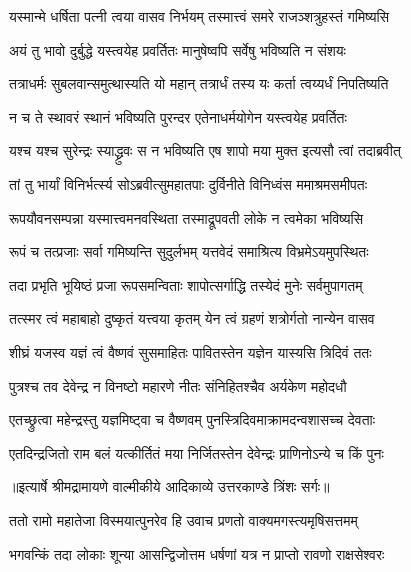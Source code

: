 \twolineshloka
{यस्मान्मे धर्षिता पत्नी त्वया वासव निर्भयम्}
{तस्मात्त्वं समरे राजञ्शत्रुहस्तं गमिष्यसि} %

\twolineshloka
{अयं तु भावो दुर्बुद्धे यस्त्वयेह प्रवर्तितः}
{मानुषेष्वपि सर्वेषु भविष्यति न संशयः} %

\twolineshloka
{तत्राधर्मः सुबलवान्समुत्थास्यति यो महान्}
{तत्रार्धं तस्य यः कर्ता त्वय्यर्धं निपतिष्यति} %

\twolineshloka
{न च ते स्थावरं स्थानं भविष्यति पुरन्दर}
{एतेनाधर्मयोगेन यस्त्वयेह प्रवर्तितः} %

\twolineshloka
{यश्च यश्च सुरेन्द्रः स्याद्ध्रुवः स न भविष्यति}
{एष शापो मया मुक्त इत्यसौ त्वां तदाब्रवीत्} %

\twolineshloka
{तां तु भार्यां विनिर्भर्त्स्य सोऽब्रवीत्सुमहातपाः}
{दुर्विनीते विनिध्वंस ममाश्रमसमीपतः} %

\twolineshloka
{रूपयौवनसम्पन्ना यस्मात्त्वमनवस्थिता}
{तस्माद्रूपवती लोके न त्वमेका भविष्यसि} %

\twolineshloka
{रूपं च तत्प्रजाः सर्वा गमिष्यन्ति सुदुर्लभम्}
{यत्तवेदं समाश्रित्य विभ्रमेऽयमुपस्थितः} %

\twolineshloka
{तदा प्रभृति भूयिष्ठं प्रजा रूपसमन्विताः}
{शापोत्सर्गाद्धि तस्येदं मुनेः सर्वमुपागतम्} %

\twolineshloka
{तत्स्मर त्वं महाबाहो दुष्कृतं यत्त्वया कृतम्}
{येन त्वं ग्रहणं शत्रोर्गतो नान्येन वासव} %

\twolineshloka
{शीघ्रं यजस्व यज्ञं त्वं वैष्णवं सुसमाहितः}
{पावितस्तेन यज्ञेन यास्यसि त्रिदिवं ततः} %

\twolineshloka
{पुत्रश्च तव देवेन्द्र न विनष्टो महारणे}
{नीतः संनिहितश्चैव अर्यकेण महोदधौ} %

\twolineshloka
{एतच्छ्रुत्वा महेन्द्रस्तु यज्ञमिष्ट्वा च वैष्णवम्}
{पुनस्त्रिदिवमाक्रामदन्वशासच्च देवताः} %

\twolineshloka
{एतदिन्द्रजितो राम बलं यत्कीर्तितं मया}
{निर्जितस्तेन देवेन्द्रः प्राणिनोऽन्ये च किं पुनः} %


{॥इत्यार्षे श्रीमद्रामायणे वाल्मीकीये आदिकाव्ये उत्तरकाण्डे त्रिंशः सर्गः॥}


\twolineshloka
{ततो रामो महातेजा विस्मयात्पुनरेव हि}
{उवाच प्रणतो वाक्यमगस्त्यमृषिसत्तमम्} %

\twolineshloka
{भगवन्किं तदा लोकाः शून्या आसन्द्विजोत्तम}
{धर्षणां यत्र न प्राप्तो रावणो राक्षसेश्वरः} %

